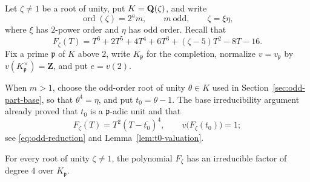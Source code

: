 Let $\zeta\ne1$ be a root of unity, put $K=\mathbf Q(\zeta)$, and write
\[
 \operatorname{ord}(\zeta)=2^a m,
 \qquad m\ \text{odd},
 \qquad \zeta=\xi\eta,
\]
where $\xi$ has $2$-power order and $\eta$ has odd order.  Recall that
\[
 F_\zeta(T)
 =T^6+2T^5+4T^4+6T^3+(\zeta-5)T^2-8T-16.
\]
Fix a prime $\mathfrak p$ of $K$ above $2$, write
$K_{\mathfrak p}$ for the completion, normalize
$v=v_{\mathfrak p}$ by $v(K_{\mathfrak p}^\times)=\mathbf Z$, and put
$e=v(2)$.

When $m>1$, choose the odd-order root of unity $\theta\in K$ used in
Section~\ref{sec:odd-part-base}, so that $\theta^4=\eta$, and put
$t_0=\theta-1$.  The base irreducibility argument already proved that
$t_0$ is a $\mathfrak p$-adic unit and that
\[
 \overline{F_\zeta(T)}=T^2(T-\overline{t_0})^4,
 \qquad
 v\bigl(F_\zeta(t_0)\bigr)=1;
\]
see \eqref{eq:odd-reduction} and Lemma~\ref{lem:t0-valuation}.

\begin{proposition}
\label{prop:local-quartic-factor}
For every root of unity $\zeta\ne1$, the polynomial $F_\zeta$ has an
irreducible factor of degree $4$ over $K_{\mathfrak p}$.
\end{proposition}

